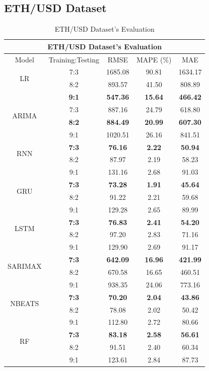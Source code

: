 \documentclass{ieeeojies}
\begin{document}
\subsection{ETH/USD Dataset}
\begin{table}[H]
	\centering
	\begin{tabular}{|c|c|c|c|c|}
		\hline
		\multicolumn{5}{|c|}{\textbf{ETH/USD Dataset's Evaluation}}\\
		\hline
		\centering Model & Training:Testing & RMSE & MAPE (\%) & MAE\\
		\hline
		\multirow{2}{*}{LR} & 7:3 & 1685.08 &  90.81 &  1634.17 \\ & 8:2 & 893.57 & 41.50 & 808.89 \\ & \textbf{9:1} & \textbf{547.36} & \textbf{15.64} & \textbf{466.42}\\
		\hline
		\multirow{2}{*}{ARIMA} & 7:3 & 887.16 & 24.79 & 618.80 \\ & \textbf{8:2} & \textbf{884.49}& \textbf{20.99} & \textbf{607.30} \\ & 9:1 & 1020.51 & 26.16 & 841.51\\
		\hline
		\multirow{2}{*}{RNN} & \textbf{7:3} & \textbf{76.16} & \textbf{2.22} & \textbf{50.94}\\ & 8:2& 87.97 & 2.19 & 58.23 \\ & 9:1 & 131.16 & 2.68 & 91.03\\
		\hline
		\multirow{2}{*}{GRU} & \textbf{7:3}	& \textbf{73.28} &  \textbf{1.91} &  \textbf{45.64} \\ & 8:2 & 91.22 & 2.21 & 59.68 \\ & 9:1 & 129.28  & 2.65 & 89.99\\
		\hline
		\multirow{2}{*}{LSTM} & \textbf{7:3} &  \textbf{76.83} &  \textbf{2.41} & \textbf{54.20} \\ & 8:2 &  97.20 & 2.83 &  71.16 \\ & 9:1 & 129.90  & 2.69 & 91.17\\
		\hline
		\multirow{2}{*}{SARIMAX} & \textbf{7:3}	& \textbf{642.09} & \textbf{16.96} &  \textbf{421.99} \\ & 8:2 & 670.58 & 16.65 & 460.51 \\ & 9:1 & 938.35 &  24.06 & 773.16\\
		\hline
		\multirow{2}{*}{NBEATS} & \textbf{7:3} & \textbf{70.20} & \textbf{2.04} & \textbf{43.86} \\ & 8:2 & 78.08 & 2.02 & 50.42 \\ & 9:1 & 112.80	& 2.72 & 80.66 \\
		\hline
		\multirow{2}{*}{RF} & \textbf{7:3} & \textbf{83.18} & \textbf{2.58} & \textbf{56.61} \\ & 8:2 & 91.51 & 2.40 & 60.34 \\ & 9:1 & 123.61 & 2.84 & 87.73 \\
		\hline
	\end{tabular}
	\caption{ETH/USD Dataset's Evaluation}
	\label{ethresult}
\end{table}
\end{document}
